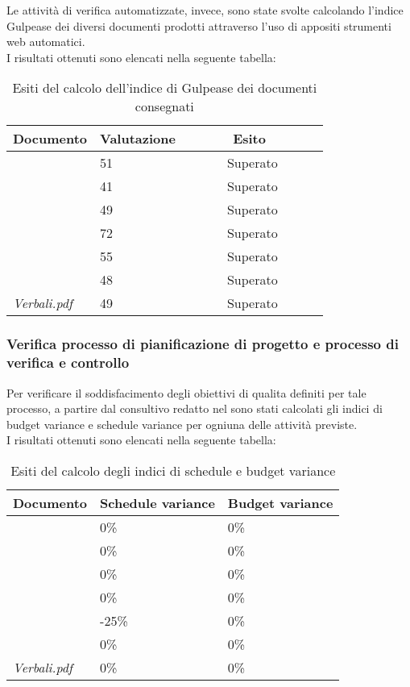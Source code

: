 		Le attività di verifica automatizzate, invece, sono state svolte calcolando l'indice Gulpease dei 	
		diversi documenti prodotti attraverso l'uso di appositi strumenti web automatici. 
		\\I risultati ottenuti sono elencati nella seguente tabella:
		\begin{table}[H]
		\begin{tabular}{|l|l|l|}
		\hline
		\textbf{Documento} 		&\textbf{Valutazione} &\textbf{~~~~~~Esito~~~~~~} \\
		\hline
		\PdQ 					&51		&~~~~~~Superato~~~~~~\\
		\NdP 					&41		&~~~~~~Superato~~~~~~\\
		\SdF 					&49		&~~~~~~Superato~~~~~~\\	
		\AdR 					&72		&~~~~~~Superato~~~~~~\\
		\PdP 					&55		&~~~~~~Superato~~~~~~\\
		\Glossario 				&48		&~~~~~~Superato~~~~~~\\
		\textit{Verbali.pdf} 		&49		&~~~~~~Superato~~~~~~\\
		\hline
		\end{tabular}
		\caption{Esiti del calcolo dell'indice di Gulpease dei documenti consegnati}
		\end{table}
		
		\subsubsection{Verifica processo di pianificazione di progetto e processo di verifica e controllo}
		Per verificare il soddisfacimento degli obiettivi di qualita definiti per tale processo, a partire dal 				consultivo redatto nel \PdP sono stati calcolati gli indici di budget variance e schedule variance per 				ogniuna delle attività previste.
		\\I risultati ottenuti sono elencati nella seguente tabella:	
		\begin{table}[H]
		\begin{tabular}{|l|l|l|}
		\hline
		\textbf{Documento} 		&\textbf{Schedule variance} &\textbf{Budget variance} \\
		\hline
		\PdQ 					&0\%		&0\%\\
		\NdP 					&0\%		&0\%\\
		\SdF 					&0\%		&0\%\\
		\AdR 					&0\%		&0\%\\
		\PdP 					&-25\%		&0\%\\
		\Glossario 				&0\%		&0\%\\
		\textit{Verbali.pdf} 	&0\%		&0\%\\
		\hline
		\end{tabular}
		\caption{Esiti del calcolo degli indici di schedule e budget variance}
		\end{table}




